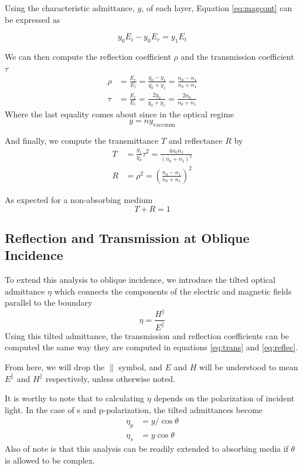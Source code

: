 \documentclass{article}
\begin{document}
    Using the characteristic admittance, $y$, of each layer, Equation \ref{eq:magcont} can be expressed as

    \begin{equation}
        y_0 E_i - y_0 E_r = y_1 E_t \label{eq:admit}
    \end{equation}

    We can then compute the reflection coefficient $\rho$ and the transmission coefficient $\tau$
    \begin{align}
        \rho &= \frac{E_r}{E_i} = \frac{y_0 - y_1}{y_0 + y_1} = \frac{n_0 - n_1}{n_0 + n_1} \\
        \tau &= \frac{E_t}{E_i} = \frac{2 y_0}{y_0 + y_1} = \frac{2 n_0}{n_0+n_1}
    \end{align}
    Where the last equality comes about since in the optical regime
    $$ y = n y_{\mathrm{vaccuum}} $$

    And finally, we compute the transmittance $T$ and reflectance $R$ by
    \begin{align}
        T &= \frac{y_1}{y_0}\tau^2 = \frac{4 n_0 n_1}{(n_0 + n_1)^2} \label{eq:trans} \\
        R &= \rho^2 = \left(\frac{n_0 - n_1}{n_0 + n_1}\right)^2 \label{eq:reflec}
    \end{align}

    As expected for a non-absorbing medium $$ T + R = 1 $$

\subsection{Reflection and Transmission at Oblique Incidence}
    To extend this analysis to oblique incidence, we introduce the tilted optical admittance $\eta$ which connects the components of the electric and magnetic fields parallel to the boundary
    \begin{equation}
        \eta = \frac{H^{\parallel}}{E^{\parallel}}
    \end{equation}
    Using this tilted admittance, the transmission and reflection coefficients can be computed the same way they are computed in equations \ref{eq:trans} and \ref{eq:reflec}.

    From here, we will drop the $\parallel$ symbol, and $E$ and $H$ will be understood to mean $E^\parallel$ and $H^\parallel$ respectively, unless otherwise noted.

    It is worthy to note that to calculating $\eta$ depends on the polarization of incident light. In the case of s and p-polarization, the tilted admittances become
    \begin{align}
        \eta_p &= y/\cos \theta \\
        \eta_s &= y \cos \theta
    \end{align}
    Also of note is that this analysis can be readily extended to absorbing media if $\theta$ is allowed to be complex.
\end{document}
